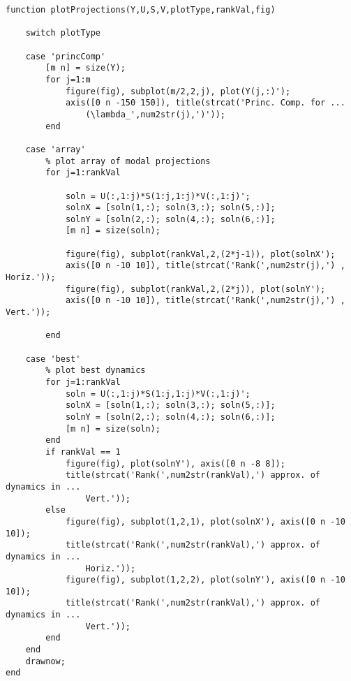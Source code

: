 \begin{verbatim}
function plotProjections(Y,U,S,V,plotType,rankVal,fig)

    switch plotType

    case 'princComp'	
        [m n] = size(Y);
        for j=1:m
            figure(fig), subplot(m/2,2,j), plot(Y(j,:)');
            axis([0 n -150 150]), title(strcat('Princ. Comp. for ...
                (\lambda_',num2str(j),')'));
        end
		
    case 'array'	
        % plot array of modal projections
        for j=1:rankVal

            soln = U(:,1:j)*S(1:j,1:j)*V(:,1:j)';
            solnX = [soln(1,:); soln(3,:); soln(5,:)];
            solnY = [soln(2,:); soln(4,:); soln(6,:)];
            [m n] = size(soln);

            figure(fig), subplot(rankVal,2,(2*j-1)), plot(solnX');
            axis([0 n -10 10]),	title(strcat('Rank(',num2str(j),') , Horiz.'));
            figure(fig), subplot(rankVal,2,(2*j)), plot(solnY');
            axis([0 n -10 10]),	title(strcat('Rank(',num2str(j),') , Vert.'));
			
        end
	
    case 'best'	
        % plot best dynamics
        for j=1:rankVal
            soln = U(:,1:j)*S(1:j,1:j)*V(:,1:j)';
            solnX = [soln(1,:); soln(3,:); soln(5,:)];
            solnY = [soln(2,:); soln(4,:); soln(6,:)];
            [m n] = size(soln);
        end
        if rankVal == 1
            figure(fig), plot(solnY'), axis([0 n -8 8]);
            title(strcat('Rank(',num2str(rankVal),') approx. of dynamics in ...
                Vert.'));
        else
            figure(fig), subplot(1,2,1), plot(solnX'), axis([0 n -10 10]);
            title(strcat('Rank(',num2str(rankVal),') approx. of dynamics in ...
                Horiz.'));
            figure(fig), subplot(1,2,2), plot(solnY'), axis([0 n -10 10]);
            title(strcat('Rank(',num2str(rankVal),') approx. of dynamics in ...
                Vert.'));
        end
    end	
    drawnow;
end
\end{verbatim}